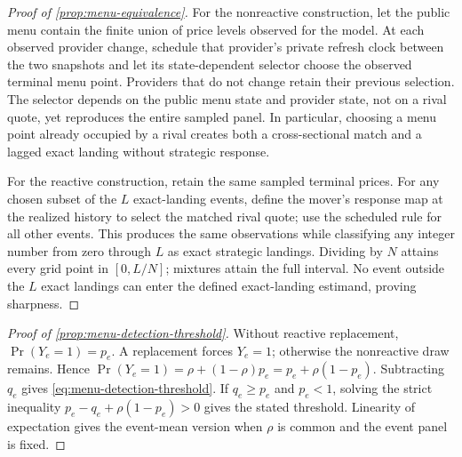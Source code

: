 \documentclass[11pt]{article}
\newcommand{\1}{\mathbf{1}}
\begin{document}
\begin{proof}[Proof of \cref{prop:menu-equivalence}]
For the nonreactive construction, let the public menu contain the finite union of
price levels observed for the model.  At each observed provider change, schedule
that provider's private refresh clock between the two snapshots and let its
state-dependent selector choose the observed terminal menu point.  Providers that
do not change retain their previous selection.  The selector depends on the
public menu state and provider state, not on a rival quote, yet reproduces the
entire sampled panel.  In particular, choosing a menu point already occupied by a
rival creates both a cross-sectional match and a lagged exact landing without
strategic response.

For the reactive construction, retain the same sampled terminal prices.  For any
chosen subset of the $L$ exact-landing events, define the mover's response map at
the realized history to select the matched rival quote; use the scheduled rule for
all other events.  This produces the same observations while classifying any
integer number from zero through $L$ as exact strategic landings.  Dividing by
$N$ attains every grid point in $[0,L/N]$; mixtures attain the full interval.
No event outside the $L$ exact landings can enter the defined exact-landing
estimand, proving sharpness.
\end{proof}

\begin{proof}[Proof of \cref{prop:menu-detection-threshold}]
Without reactive replacement, $\Pr(Y_e=1)=p_e$.  A replacement forces $Y_e=1$;
otherwise the nonreactive draw remains.  Hence
$\Pr(Y_e=1)=\rho+(1-\rho)p_e=p_e+\rho(1-p_e)$.  Subtracting $q_e$ gives
\cref{eq:menu-detection-threshold}.  If $q_e\geq p_e$ and $p_e<1$, solving the
strict inequality $p_e-q_e+\rho(1-p_e)>0$ gives the stated threshold.  Linearity
of expectation gives the event-mean version when $\rho$ is common and the event
panel is fixed.
\end{proof}
\end{document}
